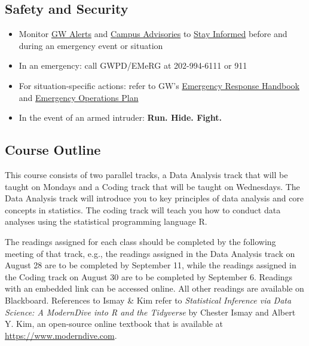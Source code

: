 \documentclass[12pt,letterpaper]{article}
\begin{document}
\subsection*{Safety and Security}

\begin{itemize}
    \item Monitor \href{https://safety.gwu.edu/gw-alert-instructions}{GW Alerts} and \href{https://campusadvisories.gwu.edu/}{Campus Advisories} to \href{https://safety.gwu.edu/stay-informed}{Stay Informed} before and during an emergency event or situation
    \item In an emergency: call GWPD/EMeRG at 202-994-6111 or 911
    \item For situation-specific actions: refer to GW's \href{https://safety.gwu.edu/emergency-response-handbook}{Emergency Response Handbook} and \href{https://safety.gwu.edu/sites/g/files/zaxdzs2386/f/downloads/GWEOP_August_2018_FINAL_0.pdf}{Emergency Operations Plan}
    \item In the event of an armed intruder: \textbf{Run. Hide. Fight.}
\end{itemize}
\vspace{-.5em}

\subsection*{Course Outline}

This course consists of two parallel tracks, a Data Analysis track that will be taught on Mondays and a Coding track that will be taught on Wednesdays. The Data Analysis track will introduce you to key principles of data analysis and core concepts in statistics. The coding track will teach you how to conduct data analyses using the statistical programming language R.

The readings assigned for each class should be completed by the following meeting of that track, e.g., the readings assigned in the Data Analysis track on August 28 are to be completed by September 11, while the readings assigned in the Coding track on August 30 are to be completed by September 6. Readings with an embedded link can be accessed online. All other readings are available on Blackboard. References to Ismay \& Kim refer to \emph{Statistical Inference via Data Science: A ModernDive into R and the Tidyverse} by Chester Ismay and Albert Y. Kim, an open-source online textbook that is available at \href{https://www.moderndive.com}{https://www.moderndive.com}.
\end{document}
